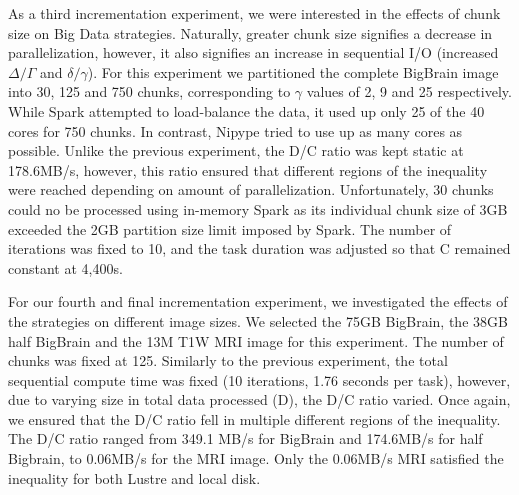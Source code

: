 \documentclass{IEEEtran}
\begin{document}
As a third incrementation experiment, we were interested in the effects of 
chunk size on Big Data strategies. Naturally, greater chunk size signifies 
a decrease in parallelization, however, it also signifies an increase in 
sequential I/O (increased $\Delta/\Gamma$ and $\delta/\gamma$). For 
this experiment we partitioned the complete BigBrain image into 30, 125 
and 750 chunks, corresponding to $\gamma$ values of 2, 9 and 25 
respectively. While Spark attempted to load-balance the data, it used 
up only 25 of the 40 cores for 750 chunks. In contrast, Nipype tried to 
use up as many cores as possible. Unlike the previous 
experiment, the D/C ratio was kept static at 178.6MB/s, however, this 
ratio ensured that different regions of the inequality were reached 
depending on amount of parallelization. Unfortunately, 30 chunks could 
no be processed using in-memory Spark as its individual chunk size of 
3GB exceeded the 2GB partition size limit imposed by Spark. The number of iterations was
fixed to 10, and the task duration was adjusted so that C remained constant at 4,400s.

For our fourth and final incrementation experiment, we investigated the effects 
of the strategies on different image sizes. We selected the 75GB BigBrain, the
38GB half BigBrain and the 13M T1W MRI image for this experiment. The number of
chunks was fixed at 125. Similarly to the previous experiment, the 
total sequential compute time was fixed (10 iterations, 1.76 seconds 
per task), however, due to varying size in total data processed (D), 
the D/C ratio varied. Once again, we ensured that the D/C ratio fell in 
multiple different regions of the inequality. The D/C ratio ranged from 
349.1 MB/s for BigBrain and 174.6MB/s for half Bigbrain, to 0.06MB/s for the MRI 
image. Only the 0.06MB/s MRI satisfied the inequality for both Lustre and local 
disk.










\end{document}

